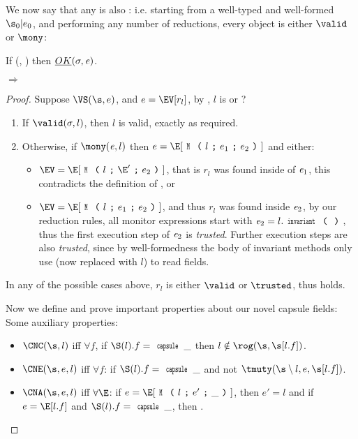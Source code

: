 \noindent We now say that any \VS is also \OK: i.e. starting from a well-typed and well-formed $\s_0|e_0$, and performing any number of reductions, every object is either $\valid$ or $\mony$:
\begin{theorem}\rm
If \VS(\s, \e) then $\emph{OK}(\sigma,{\mathit{e}})$.
\end{theorem}


\begin{theorem}\rm {} $\Rightarrow$ 
\end{theorem}
\begin{proof}
\noindent Suppose $\VS(\s, e)$, and $e = \EV[r_l]$, by , $l$ is \valid or \mony?
\SSI\begin{enumerate}
	\item If $\valid(\sigma,l)$, then $l$ is valid, exactly as required.
	\item Otherwise, if $\mony(\e,l)$ then $e = \E[\M{l}{e_1}{e_2}]$ and either:
	\begin{itemize}
	 \item $\EV = \E[\M{l}{\E'}{e_2}]$, that is $r_l$ was found inside of ${\mathit{e}}_1$, this contradicts the definition of \mony, or
	 \item $\EV = \E[\M{l}{e_1}{e_2}]$, and thus $r_l$ was found inside ${\mathit{e}}_2$,  by our reduction rules, all monitor expressions start with $\e_2=l.\invariant$, thus the first execution step
	 of ${\mathit{e}}_2$ is \emph{trusted}. Further execution steps are also \emph{trusted}, since by well-formedness the body of invariant methods only use \Q@this@ (now replaced with $l$) to read fields.
	\end{itemize}
\end{enumerate}
In any of the possible cases above, $r_l$ is either $\valid$ or $\trusted$, thus  holds.

Now we define and prove important properties about our novel capsule fields:
Some auxiliary properties:\\

\SSI\begin{itemize}
\item $\CNC(\s, l)$ iff $\forall f$,
\qindent if  $\S(l).f = \Kw{capsule}\,\_$ then $l \notin \rog(\s, \s[l.f])$.
\item $\CNE(\s, e, l)$ iff $\forall f$:
\qindent  if $\S(l).f = \Kw{capsule}\,\_$ and not $\tmuty(\s\setminus l, e, \s[l.f])$.
\item $\CNA(\s, e, l)$ iff $\forall \E$:
\qindent if $e = \E[\M{l}{e'}{\_}]$, then $e' = l$ and
\qindent if $e = \E[l.f]$ and $\S(l).f = \Kw{capsule}\,\_$, then .


\end{itemize}
\end{proof}
